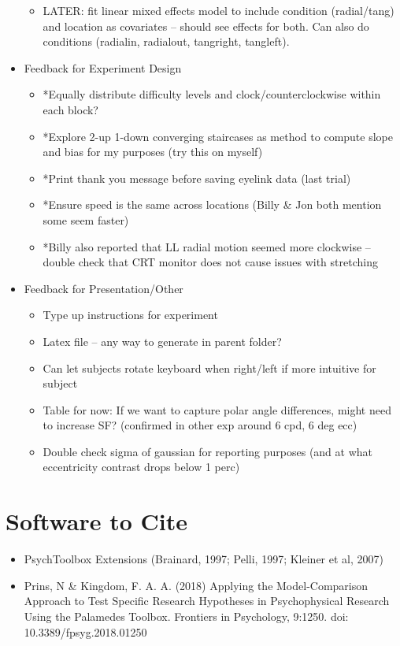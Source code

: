 \documentclass[11pt]{article} %
\begin{document}
\begin{itemize}
\begin{itemize}
	\item LATER: fit linear mixed effects model to include condition (radial/tang) and location as covariates -- should see effects for both. Can also do conditions (radialin, radialout, tangright, tangleft).
	\end{itemize}
\item Feedback for Experiment Design
	\begin{itemize}
	\item *Equally distribute difficulty levels and clock/counterclockwise within each block?
	\item *Explore 2-up 1-down converging staircases as method to compute slope and bias for my purposes (try this on myself)
	\item *Print thank you message before saving eyelink data (last trial)
	\item *Ensure speed is the same across locations (Billy \& Jon both mention some seem faster)
	\item *Billy also reported that LL radial motion seemed more clockwise -- double check that CRT monitor does not cause issues with stretching
	\end{itemize}
\item Feedback for Presentation/Other
	\begin{itemize}
	\item Type up instructions for experiment
	\item Latex file -- any way to generate in parent folder?
	\item Can let subjects rotate keyboard when right/left if more intuitive for subject
	\item Table for now: If we want to capture polar angle differences, might need to increase SF? (confirmed in other exp around 6 cpd, 6 deg ecc)
	\item Double check sigma of gaussian for reporting purposes (and at what eccentricity contrast drops below 1 perc)
	\end{itemize}
\end{itemize}

\section{Software to Cite}
\begin{itemize}
\item PsychToolbox Extensions (Brainard, 1997; Pelli, 1997; Kleiner et al, 2007)
\item Prins, N \& Kingdom, F. A. A. (2018) Applying the Model-Comparison Approach to Test Specific Research Hypotheses in Psychophysical Research Using the Palamedes Toolbox. Frontiers in Psychology, 9:1250. doi: 10.3389/fpsyg.2018.01250
\end{itemize}
\end{document}
